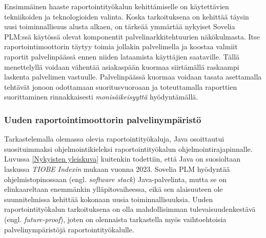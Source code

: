 Ensimmäinen haaste raportointityökalun kehittämiselle on käytettävien tekniikoiden ja teknologioiden valinta. Koska tarkoituksena on kehittää täysin uusi toiminnallisuus alusta alkaen, on tärkeää ymmärtää nykyiset Sovelia PLM:ssä käytössä olevat komponentit palvelinarkkitehtuurien näkökulmasta. Itse raportointimoottorin täytyy toimia jollakin palvelimella ja koostaa valmiit raportit palvelinpäässä ennen niiden lataamista käyttäjien saataville. Tällä menettelyllä voidaan vähentää asiakaspään kuormaa siirtämällä raskaampi laskenta palvelimen vastuulle. Palvelinpäässä kuormaa voidaan tasata asettamalla tehtävät jonoon odottamaan suoritusvuoroaan ja toteuttamalla raporttien suorittaminen rinnakkaisesti \textit{monisäikeisyyttä} hyödyntämällä.

\subsubsection{Uuden raportointimoottorin palvelinympäristö}

Tarkastelemalla olemassa olevia raportointityökaluja, Java osoittautui suosituimmaksi ohjelmointikieleksi raportointityökalun ohjelmointirajapinnalle. Luvussa \ref{Nykyisten yleiskuva} kuitenkin todettiin, että Java on suosioltaan laskussa \textit{TIOBE Indexin} mukaan vuonna 2023. Sovelia PLM hyödyntää ohjelmistopinossaan (engl. \textit{software stack}) Java-palvelinta, mutta se on elinkaareltaan enemmänkin ylläpitovaiheessa, eikä sen alaisuuteen ole suunnitelmissa kehittää kokonaan uusia toiminnallisuuksia. Uuden raportointityökalun tarkoituksena on olla mahdollisimman tulevaisuudenkestävä (engl. \textit{future-proof}), joten on olennaista tarkastella myös vaihtoehtoisia palvelinympäristöjä raportointityökalulle.

